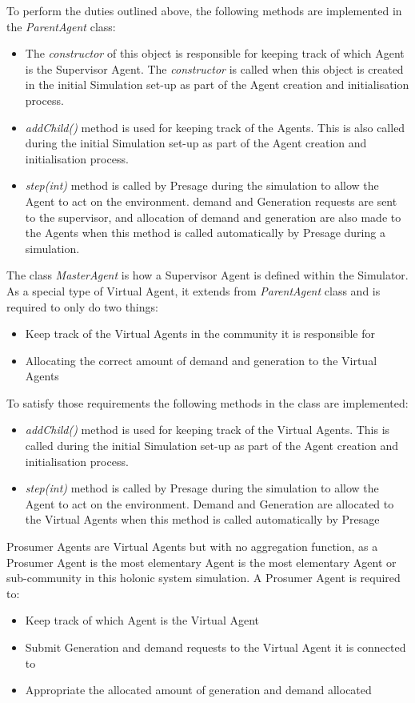 To perform the duties outlined above, the following methods are implemented in the \textit{ParentAgent} class:
\begin{itemize}
	\item The \textit{constructor} of this object is responsible for keeping track of which Agent is the Supervisor Agent. The \textit{constructor} is called when this object is created in the initial Simulation set-up as part of the Agent creation and initialisation process.
	\item \textit{addChild()} method is used for keeping track of the Agents. This is also called during the initial Simulation set-up as part of the Agent creation and initialisation process.
	\item \textit{step(int)} method is called by Presage during the simulation to allow the Agent to act on the environment. demand and Generation requests are sent to the supervisor, and allocation of demand and generation are also made to the Agents when this method is called automatically by Presage during a simulation.
\end{itemize}

The class \textit{MasterAgent} is how a Supervisor Agent is defined within the Simulator. As a special type of Virtual Agent, it extends from \textit{ParentAgent} class and is required to only do two things:
\begin{itemize}
	\item Keep track of the Virtual Agents in the community it is responsible for
	\item Allocating the correct amount of demand and generation to the Virtual Agents
\end{itemize}

To satisfy those requirements the following methods in the class are implemented:
\begin{itemize}
	\item \textit{addChild()} method is used for keeping track of the Virtual Agents. This is called during the initial Simulation set-up as part of the Agent creation and initialisation process.
	\item \textit{step(int)} method is called by Presage during the simulation to allow the Agent to act on the environment. Demand and Generation are allocated to the Virtual Agents when this method is called automatically by Presage
\end{itemize}

Prosumer Agents are Virtual Agents but with no aggregation function, as a Prosumer Agent is the most elementary Agent is the most elementary Agent or sub-community in this holonic system simulation. A Prosumer Agent is required to:
\begin{itemize}
	\item Keep track of which Agent is the Virtual Agent
	\item Submit Generation and demand requests to the Virtual Agent it is connected to
	\item Appropriate the allocated amount of generation and demand allocated
\end{itemize}

